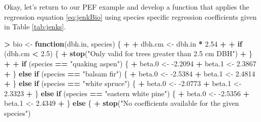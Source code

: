 \documentclass[]{krantz}
\makeatletter
\newenvironment{Shaded}{\begin{snugshade}}{\end{snugshade}}
\newcommand{\ControlFlowTok}[1]{\textcolor[rgb]{0.27,0.27,0.27}{\textbf{#1}}}
\newcommand{\FloatTok}[1]{\textcolor[rgb]{0.06,0.06,0.06}{#1}}
\newcommand{\KeywordTok}[1]{\textcolor[rgb]{0.27,0.27,0.27}{\textbf{#1}}}
\newcommand{\NormalTok}[1]{#1}
\newcommand{\OperatorTok}[1]{\textcolor[rgb]{0.43,0.43,0.43}{\textbf{#1}}}
\newcommand{\StringTok}[1]{\textcolor[rgb]{0.5,0.5,0.5}{#1}}
\newenvironment{kframe}{%
\medskip{}
\setlength{\fboxsep}{.8em}
 \def\at@end@of@kframe{}%
 \ifinner\ifhmode%
  \def\at@end@of@kframe{\end{minipage}}%
  \begin{minipage}{\columnwidth}%
 \fi\fi%
 \def\FrameCommand##1{\hskip\@totalleftmargin \hskip-\fboxsep
 \colorbox{shadecolor}{##1}\hskip-\fboxsep
     \hskip-\linewidth \hskip-\@totalleftmargin \hskip\columnwidth}%
 \MakeFramed {\advance\hsize-\width
   \@totalleftmargin\z@ \linewidth\hsize
   \@setminipage}}%
 {\par\unskip\endMakeFramed%
 \at@end@of@kframe}
\renewenvironment{Shaded}{\begin{kframe}}{\end{kframe}}
\makeatother
\begin{document}
Okay, let's return to our PEF example and develop a function that applies the regression equation \eqref{eq:jenkBio} using species specific regression coefficients given in Table \ref{tab:jenks}.

\begin{Shaded}
\begin{Highlighting}[]
\OperatorTok{>}\StringTok{ }\NormalTok{bio <-}\StringTok{ }\ControlFlowTok{function}\NormalTok{(dbh.in, species) \{}
\OperatorTok{+}\StringTok{   }
\OperatorTok{+}\StringTok{   }\NormalTok{dbh.cm <-}\StringTok{ }\NormalTok{dbh.in }\OperatorTok{*}\StringTok{ }\FloatTok{2.54}
\OperatorTok{+}\StringTok{   }
\OperatorTok{+}\StringTok{   }\ControlFlowTok{if}\NormalTok{ (dbh.cm }\OperatorTok{<}\StringTok{ }\FloatTok{2.5}\NormalTok{) \{}
\OperatorTok{+}\StringTok{     }\KeywordTok{stop}\NormalTok{(}\StringTok{"Only valid for trees greater than 2.5 cm DBH"}\NormalTok{)}
\OperatorTok{+}\StringTok{   }\NormalTok{\}}
\OperatorTok{+}\StringTok{   }
\OperatorTok{+}\StringTok{   }\ControlFlowTok{if}\NormalTok{ (species }\OperatorTok{==}\StringTok{ "quaking aspen"}\NormalTok{) \{}
\OperatorTok{+}\StringTok{     }\NormalTok{beta}\FloatTok{.0}\NormalTok{ <-}\StringTok{ }\FloatTok{-2.2094}
\OperatorTok{+}\StringTok{     }\NormalTok{beta}\FloatTok{.1}\NormalTok{ <-}\StringTok{ }\FloatTok{2.3867}
\OperatorTok{+}\StringTok{   }\NormalTok{\} }\ControlFlowTok{else} \ControlFlowTok{if}\NormalTok{ (species }\OperatorTok{==}\StringTok{ "balsam fir"}\NormalTok{) \{}
\OperatorTok{+}\StringTok{     }\NormalTok{beta}\FloatTok{.0}\NormalTok{ <-}\StringTok{ }\FloatTok{-2.5384}
\OperatorTok{+}\StringTok{     }\NormalTok{beta}\FloatTok{.1}\NormalTok{ <-}\StringTok{ }\FloatTok{2.4814}
\OperatorTok{+}\StringTok{   }\NormalTok{\} }\ControlFlowTok{else} \ControlFlowTok{if}\NormalTok{ (species }\OperatorTok{==}\StringTok{ "white spruce"}\NormalTok{) \{}
\OperatorTok{+}\StringTok{     }\NormalTok{beta}\FloatTok{.0}\NormalTok{ <-}\StringTok{ }\FloatTok{-2.0773}
\OperatorTok{+}\StringTok{     }\NormalTok{beta}\FloatTok{.1}\NormalTok{ <-}\StringTok{ }\FloatTok{2.3323}
\OperatorTok{+}\StringTok{   }\NormalTok{\} }\ControlFlowTok{else} \ControlFlowTok{if}\NormalTok{ (species }\OperatorTok{==}\StringTok{ "eastern white pine"}\NormalTok{) \{}
\OperatorTok{+}\StringTok{     }\NormalTok{beta}\FloatTok{.0}\NormalTok{ <-}\StringTok{ }\FloatTok{-2.5356}
\OperatorTok{+}\StringTok{     }\NormalTok{beta}\FloatTok{.1}\NormalTok{ <-}\StringTok{ }\FloatTok{2.4349}
\OperatorTok{+}\StringTok{   }\NormalTok{\} }\ControlFlowTok{else}\NormalTok{ \{}
\OperatorTok{+}\StringTok{     }\KeywordTok{stop}\NormalTok{(}\StringTok{"No coefficients available for the given species"}\NormalTok{)}

\end{Highlighting}
\end{Shaded}
\end{document}
